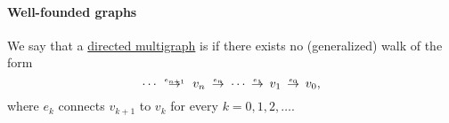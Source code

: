\paragraph{Well-founded graphs}

\begin{definition}\label{def:well_founded_graph}\mimprovised
  We say that a \hyperref[def:directed_multigraph]{directed multigraph} is  if there exists no (generalized) walk of the form
  \begin{equation}
    \cdots \reloset {e_{n+1}} \to v_n \reloset {e_n} \to \cdots \reloset {e_1} \to v_1 \reloset {e_0} \to v_0,
  \end{equation}
  where \( e_k \) connects \( v_{k+1} \) to \( v_k \) for every \( k = 0, 1, 2, \ldots \).
\end{definition}


